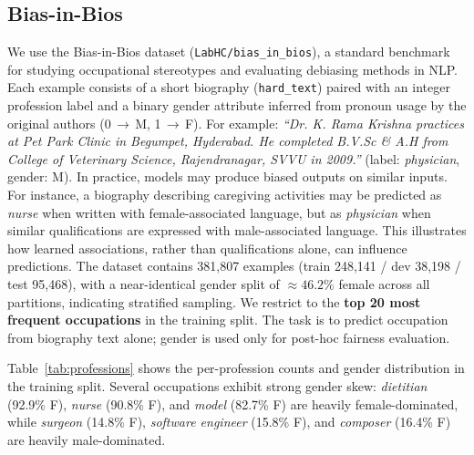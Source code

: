 \documentclass[11pt]{article}
\begin{document}
\subsection{Bias-in-Bios}
We use the Bias-in-Bios dataset \citep{de-arteaga-etal-2019-bias}
(\texttt{LabHC/bias\_in\_bios}), a standard benchmark for studying
occupational stereotypes and evaluating debiasing methods in NLP.
Each example consists of a short biography (\texttt{hard\_text}) paired
with an integer profession label and a binary gender attribute inferred
from pronoun usage by the original authors (0\,$\to$\,M, 1\,$\to$\,F).
For example: \textit{``Dr. K. Rama Krishna practices at Pet Park Clinic 
in Begumpet, Hyderabad. He completed B.V.Sc & A.H from College of Veterinary
 Science, Rajendranagar, SVVU in 2009.''} (label: \emph{physician}, gender: M).
In practice, models may produce biased outputs on similar inputs.
For instance, a biography describing caregiving activities may be predicted as
\emph{nurse} when written with female-associated language, but as \emph{physician}
when similar qualifications are expressed with male-associated language.
This illustrates how learned associations, rather than qualifications alone,
can influence predictions.
The dataset contains 381,807 examples (train 248,141 / dev 38,198 /
test 95,468), with a near-identical gender split of $\approx\!46.2\%$
female across all partitions, indicating stratified sampling.
We restrict to the \textbf{top 20 most frequent occupations} in the
training split. The task is to predict occupation from biography text
alone; gender is used only for post-hoc fairness evaluation.

Table~\ref{tab:professions} shows the per-profession counts and gender
distribution in the training split. Several occupations exhibit strong
gender skew: \emph{dietitian} (92.9\% F), \emph{nurse} (90.8\% F),
and \emph{model} (82.7\% F) are heavily female-dominated, while
\emph{surgeon} (14.8\% F), \emph{software engineer} (15.8\% F), and
\emph{composer} (16.4\% F) are heavily male-dominated.
\end{document}
